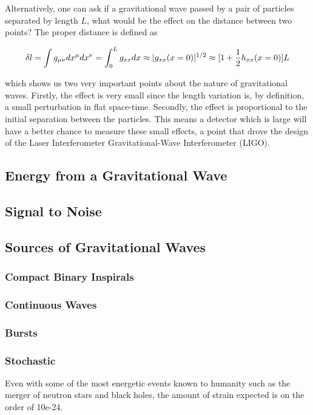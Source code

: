 \documentclass[oneside]{book}
\begin{document}
	Alternatively, one can ask if a gravitational wave passed by a pair of particles separated by length $L$, what would be the effect on the distance between two points?  The proper distance is defined as

	\begin{equation}\label{propdist}
	\delta l
	= \int{g_{\mu \nu} dx^{\mu} dx^{\nu}} \\
	= \int_{0}^{L}{g_{xx} {d}x}\\
	\approx |g_{xx}(x=0)|^{1/2}\\
	\approx [ 1 + \frac{1}{2} h_{xx}(x=0)] L
	\end{equation} 
	
	which shows us two very important points about the nature of gravitational waves.  Firstly, the effect is very small since the length variation is, by definition, a small perturbation in flat space-time.  Secondly, the effect is proportional to the initial separation between the particles. This means a detector which is large will have a better chance to measure these small effects, a point that drove the design of the Laser Interferometer Gravitational-Wave Interferometer (LIGO).
	
	\subsection{Energy from a Gravitational Wave}
	
	\subsection{Signal to Noise}
	
	\subsection{Sources of Gravitational Waves}
	\subsubsection{Compact Binary Inspirals}
	\subsubsection{Continuous Waves}
	\subsubsection{Bursts}
	\subsubsection{Stochastic}
	Even with some of the most energetic events known to humanity such as the merger of neutron stars and black holes, the amount of strain expected is on the order of 10e-24.
	
\end{document}
